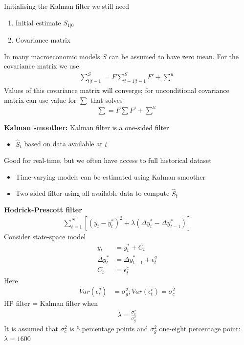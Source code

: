 \documentclass{beamer}
\begin{document}
\begin{frame}
  Initialising the Kalman filter we still need
  \begin{enumerate}
    \item Initial estimate $S_{1|0}$
    \item Covariance matrix
  \end{enumerate}
  \medskip
  In many macroeconomic models $S$ can be assumed to have zero mean. For the covariance matrix we use
  \begin{align}
    \scriptstyle \sum^S_{t|t-1} = \textstyle F \scriptstyle \sum^S_{t-1|t-1} \textstyle F' + \scriptstyle \sum^u
  \end{align}
  Values of this covariance matrix will converge; for unconditional covariance matrix can use value for $\sum$ that solves
  \begin{align}
    \scriptstyle \sum=\textstyle F \scriptstyle \sum \textstyle F' + \scriptstyle \sum^u
  \end{align}
\end{frame}

\begin{frame}
  \textbf{Kalman smoother:} Kalman filter is a one-sided filter
  \begin{itemize}
    \item $\hat{S}_t$ based on data available at $t$ 
  \end{itemize}
  \medskip
  Good for real-time, but we often have access to full historical dataset
  \begin{itemize}
    \item Time-varying models can be estimated using Kalman smoother
    \item Two-sided filter using all available data to compute $\hat{S}_t$
  \end{itemize}  
\end{frame}

\begin{frame}
  \textbf{Hodrick-Prescott filter}
  \begin{align}
    \sum_{t=1}^{N} [(y_t - y_t^*)^2+ \lambda(\Delta y_t^* - \Delta y_{t-1}^*)]
  \end{align}
  Consider state-space model
  \begin{align}
    y_t &= y^*_t+C_t\\
    \Delta y^*_t &= \Delta y^*_{t-1} + \epsilon^g_t \\
    C_t &= \epsilon_t^c
  \end{align}
  Here
  \begin{align}
    Var(\epsilon^g_t) &= \sigma_g^2; Var(\epsilon_t^c) = \sigma_c^2
  \end{align}
  HP filter = Kalman filter when
  \begin{align}
    \lambda = \frac{\sigma_c^2}{\sigma_g^2} 
  \end{align}
  It is assumed that $\sigma_c^2$ is 5 percentage points and $\sigma_g^2$ one-eight percentage point: $\lambda=1600$
\end{frame}
\end{document}
